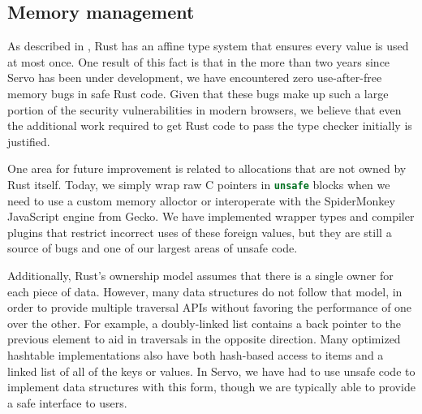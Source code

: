 \subsection{Memory management}
As described in , Rust has an affine type system that ensures every value is used at
most once.
One result of this fact is that in the more than two years since Servo has been under development, we have
encountered zero use-after-free memory bugs in safe Rust code.
Given that these bugs make up such a large portion of the security vulnerabilities in modern browsers,
we believe that even the additional work required to get Rust code to pass the type checker initially is
justified.

One area for future improvement is related to allocations that are not owned by Rust itself.
Today, we simply wrap raw C pointers in \lstinline[language=Rust]{unsafe} blocks when we need to use a
custom memory alloctor or interoperate with the SpiderMonkey JavaScript engine from Gecko.
We have implemented wrapper types and compiler plugins that restrict incorrect uses of these foreign values,
but they are still a source of bugs and one of our largest areas of unsafe code.

Additionally, Rust's ownership model assumes that there is a single owner for each piece of data.
However, many data structures do not follow that model, in order to provide multiple traversal
APIs without favoring the performance of one over the other.
For example, a doubly-linked list contains a back pointer to the previous element to aid
in traversals in the opposite direction.
Many optimized hashtable implementations also have both hash-based access to items
and a linked list of all of the keys or values.
In Servo, we have had to use unsafe code to implement data structures with this form,
though we are typically able to provide a safe interface to users.

